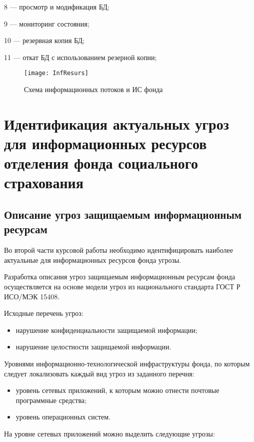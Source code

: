 8 --- просмотр и модификация БД;

9 --- мониторинг состояния;

10 --- резервная копия БД;

11 --- откат БД с использованием резерной копии;

\begin{figure}[h]
  \centering
  \texttt{[image: InfResurs]}
  \caption{Схема информационных потоков и ИС фонда}
  \label{fig:infresurs}  
\end{figure}

\cleardoublepage

\section{Идентификация актуальных угроз для информационных ресурсов
  отделения фонда социального страхования}
\label{sec:2}

\subsection{Описание угроз защищаемым информационным ресурсам}

\point Во второй части курсовой работы необходимо идентифицировать наиболее
актуальные для информационных ресурсов фонда угрозы.

Разработка описания угроз защищаемым информационным ресурсам фонда
осуществляется на основе модели угроз из национального стандарта ГОСТ
Р ИСО/МЭК 15408.

\point Исходные перечень угроз:

\begin{itemize}
\item нарушение конфиденциальности защищаемой информации;
\item нарушение целостности защищаемой информации.
\end{itemize}

\point Уровнями информационно-технологической инфраструктуры фонда, по
которым следует локализовать каждый вид угроз из заданного перечня:

\begin{itemize}
\item уровень сетевых приложений, к которым можно отнести почтовые
  программные средства;
\item уровень операционных систем.
\end{itemize}

\point На уровне сетевых приложений можно выделить следующие угрозы:

